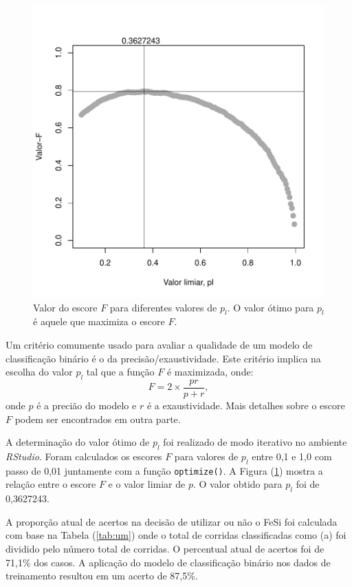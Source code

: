 	\begin{figure}[H]
		\centering
		\includegraphics[scale=0.55, bb=0 0 432 432, trim=0in 20pt 0in 40pt]{figures/fig03.pdf}
		\caption{Valor do escore $F$ para diferentes valores de $p_l$. O valor ótimo para $p_l$ é aquele que maximiza o escore $F$.}
		\label{fig:sa}
	\end{figure}	
	Um critério comumente usado para avaliar a qualidade de um modelo de classificação binário é o da precisão/exaustividade\cite{wiki:pr}. Este critério implica na escolha do valor $p_l$ tal que a função $F$ é maximizada, onde:
	\begin{equation}
		\label{eq:defF}
		F=2\times\frac{pr}{p+r},
	\end{equation}
	\noindent onde $p$ é a precião do modelo e $r$ é a exaustividade. Mais detalhes sobre o escore $F$ podem ser encontrados em outra parte\cite{wiki:pr}.
	
	A determinação do valor ótimo de $p_l$ foi realizado de modo iterativo no ambiente \textit{RStudio}. Foram calculados os escores $F$ para valores de $p_l$ entre 0,1 e 1,0 com passo de 0,01 juntamente com a função \texttt{optimize()}. A Figura (\ref{fig:sa}) mostra a relação entre o escore $F$ e o valor limiar de $p$. O valor obtido para $p_l$ foi de 0,3627243.

	A proporção atual de acertos na decisão de utilizar ou não o FeSi foi calculada com base na Tabela (\ref{tab:um}) onde o total de corridas classificadas como (a) foi dividido pelo número total de corridas. O percentual atual de acertos foi de 71,1\% dos casos. A aplicação do modelo de classificação binário nos dados de treinamento resultou em um acerto de 87,5\%.
	
